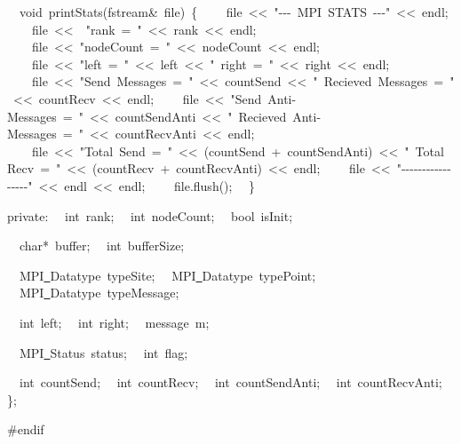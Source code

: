 {\ \ void\ printStats(fstream\&\ file)\ \{
\ \ \ \ file\ <{}<{}\ "{}-{}-{}-{}\ MPI\ STATS\ -{}-{}-{}"{}\ <{}<{}\ endl;
\ \ \ \ file\ <{}<{}\ \ "{}rank\ =\ "{}\ <{}<{}\ rank\ <{}<{}\ endl;
\ \ \ \ file\ <{}<{}\ "{}nodeCount\ =\ "{}\ <{}<{}\ nodeCount\ <{}<{}\ endl;
\ \ \ \ file\ <{}<{}\ "{}left\ =\ "{}\ <{}<{}\ left\ <{}<{}\ "{}\ right\ =\ "{}\ <{}<{}\ right\ <{}<{}\ endl;
\ \ \ \ file\ <{}<{}\ "{}Send\ Messages\ =\ "{}\ <{}<{}\ countSend\ <{}<{}\ "{}\ Recieved\ Messages\ =\ "{}\ <{}<{}\ countRecv\ <{}<{}\ endl;
\ \ \ \ file\ <{}<{}\ "{}Send\ Anti-{}Messages\ =\ "{}\ <{}<{}\ countSendAnti\ <{}<{}\ "{}\ Recieved\ Anti-{}Messages\ =\ "{}\ <{}<{}\ countRecvAnti\ <{}<{}\ endl;
\ \ \ \ file\ <{}<{}\ "{}Total\ Send\ =\ "{}\ <{}<{}\ (countSend\ +\ countSendAnti)\ <{}<{}\ "{}\ Total\ Recv\ =\ "{}\ <{}<{}\ (countRecv\ +\ countRecvAnti)\ <{}<{}\ endl;
\ \ \ \ file\ <{}<{}\ "{}-{}-{}-{}-{}-{}-{}-{}-{}-{}-{}-{}-{}-{}-{}-{}-{}-{}"{}\ <{}<{}\ endl\ <{}<{}\ endl;
\ \ \ \ file.flush();
\ \ \}

private:
\ \ int\ rank;
\ \ int\ nodeCount;
\ \ bool\ isInit;

\ \ char*\ buffer;
\ \ int\ bufferSize;

\ \ MPI\underline\ Datatype\ typeSite;
\ \ MPI\underline\ Datatype\ typePoint;
\ \ MPI\underline\ Datatype\ typeMessage;

\ \ int\ left;
\ \ int\ right;
\ \ message\ m;

\ \ MPI\underline\ Status\ status;
\ \ int\ flag;

\ \ int\ countSend;
\ \ int\ countRecv;
\ \ int\ countSendAnti;
\ \ int\ countRecvAnti;
\};

\#endif

 }
\normalfont\normalsize

